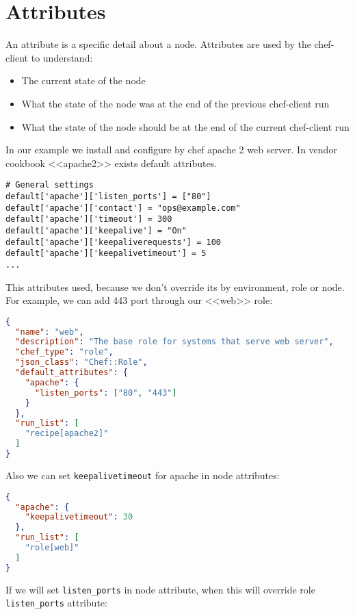 \section{Attributes}
\label{sec:solo-attributes}

An attribute is a specific detail about a node. Attributes are used by the chef-client to understand:

\begin{itemize}
  \item The current state of the node
  \item What the state of the node was at the end of the previous chef-client run
  \item What the state of the node should be at the end of the current chef-client run
\end{itemize}

In our example we install and configure by chef apache 2 web server. In vendor cookbook <<apache2>> exists default attributes.

\begin{lstlisting}[label=lst:my-cloud-attributes1]
# General settings
default['apache']['listen_ports'] = ["80"]
default['apache']['contact'] = "ops@example.com"
default['apache']['timeout'] = 300
default['apache']['keepalive'] = "On"
default['apache']['keepaliverequests'] = 100
default['apache']['keepalivetimeout'] = 5
...
\end{lstlisting}

This attributes used, because we don't override its by environment, role or node. For example, we can add 443 port through our <<web>> role:

\begin{lstlisting}[language=JSON,label=lst:my-cloud-attributes2]
{
  "name": "web",
  "description": "The base role for systems that serve web server",
  "chef_type": "role",
  "json_class": "Chef::Role",
  "default_attributes": {
    "apache": {
      "listen_ports": ["80", "443"]
    }
  },
  "run_list": [
    "recipe[apache2]"
  ]
}
\end{lstlisting}

Also we can set \lstinline!keepalivetimeout! for apache in node attributes:

\begin{lstlisting}[language=JSON,label=lst:my-cloud-attributes3]
{
  "apache": {
    "keepalivetimeout": 30
  },
  "run_list": [
    "role[web]"
  ]
}
\end{lstlisting}

If we will set \lstinline!listen_ports! in node attribute, when this will override role \lstinline!listen_ports! attribute:

